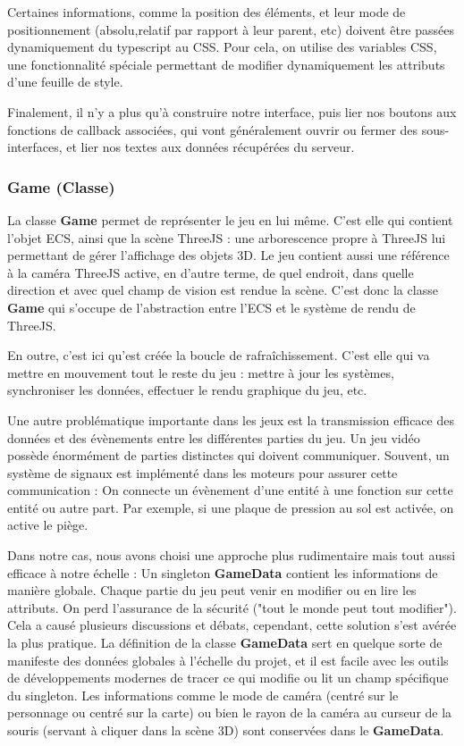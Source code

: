     Certaines informations, comme la position des éléments, et leur mode de positionnement (absolu,relatif par rapport à leur parent, etc) doivent être passées dynamiquement du typescript au CSS. Pour cela, on utilise des variables CSS, une fonctionnalité spéciale permettant de modifier dynamiquement les attributs d'une feuille de style.
    
    Finalement, il n'y a plus qu'à construire notre interface, puis lier nos boutons aux fonctions de callback associées, qui vont généralement ouvrir ou fermer des sous-interfaces, et lier nos textes aux données récupérées du serveur.



\subsubsection{Game (Classe)}
    La classe \textbf{Game} permet de représenter le jeu en lui même. C'est elle qui contient l'objet ECS, ainsi que la scène ThreeJS : une arborescence propre à ThreeJS lui permettant de gérer l'affichage des objets 3D. Le jeu contient aussi une référence à la caméra ThreeJS active, en d'autre terme, de quel endroit, dans quelle direction et avec quel champ de vision est rendue la scène. C'est donc la classe \textbf{Game} qui s'occupe de l'abstraction entre l'ECS et le système de rendu de ThreeJS.

    En outre, c'est ici qu'est créée la boucle de rafraîchissement. C'est elle qui va mettre en mouvement tout le reste du jeu : mettre à jour les systèmes, synchroniser les données, effectuer le rendu graphique du jeu, etc.

    Une autre problématique importante dans les jeux est la transmission efficace des données et des évènements entre les différentes parties du jeu. Un jeu vidéo possède énormément de parties distinctes qui doivent communiquer. Souvent, un système de signaux est implémenté dans les moteurs pour assurer cette communication : On connecte un évènement d'une entité à une fonction sur cette entité ou autre part. Par exemple, si une plaque de pression au sol est activée, on active le piège.

    Dans notre cas, nous avons choisi une approche plus rudimentaire mais tout aussi efficace à notre échelle : Un singleton \textbf{GameData} contient les informations de manière globale. Chaque partie du jeu peut venir en modifier ou en lire les attributs. On perd l'assurance de la sécurité ("tout le monde peut tout modifier"). Cela a causé plusieurs discussions et débats, cependant, cette solution s'est avérée la plus pratique. La définition de la classe \textbf{GameData} sert en quelque sorte de manifeste des données globales à l'échelle du projet, et il est facile avec les outils de développements modernes de tracer ce qui modifie ou lit un champ spécifique du singleton.
    Les informations comme le mode de caméra (centré sur le personnage ou centré sur la carte) ou bien le rayon de la caméra au curseur de la souris (servant à cliquer dans la scène 3D) sont conservées dans le \textbf{GameData}.




    